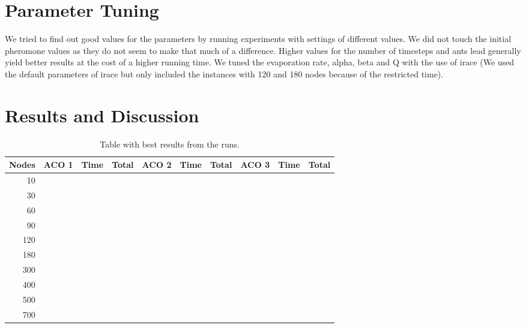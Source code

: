 \documentclass[a4paper]{scrartcl}
\begin{document}
\section{Parameter Tuning}
We tried to find out good values for the parameters by running experiments with settings of different values. We did not touch the initial pheromone values as they do not seem to make that much of a difference. Higher values for the number of timesteps and ants lead generally yield better results at the cost of a higher running time.
We tuned the evaporation rate, alpha, beta and Q with the use of irace \cite{lopez2011irace} (We used the default parameters of irace but only included the instances with 120 and 180 nodes because of the restricted time).


\section{Results and Discussion}


\begin{table}
    \begin{adjustwidth}{-.5in}{-.5in}  
        \begin{center}
\begin{tabular}{r | r | r | r | r | r | r | r | r | r}
\hline
Nodes & ACO 1 & Time & Total & ACO 2 & Time & Total & ACO 3 & Time & Total \\
\hline \hline 
10 &  &  &  &  &  &  &  &  &  \\
\hline
30 &  &  &  &  &  &  &  &  &  \\
\hline
60 &  &  &  &  &  &  &  &  &  \\
\hline
90 &  &  &  &  &  &  &  &  &  \\
\hline
120 &  &  &  &  &  &  &  &  &  \\
\hline
180 &  &  &  &  &  &  &  &  &  \\
\hline
300 &  &  &  &  &  &  &  &  &  \\
\hline
400 &  &  &  &  &  &  &  &  &  \\
\hline
500 &  &  &  &  &  &  &  &  &  \\
\hline
700 &  &  &  &  &  &  &  &  &  \\
\hline
\end{tabular}

        \caption{Table with best results from the runs. }
        \label{myTable}
        \end{center}
    \end{adjustwidth}
\end{table}



\end{document}
